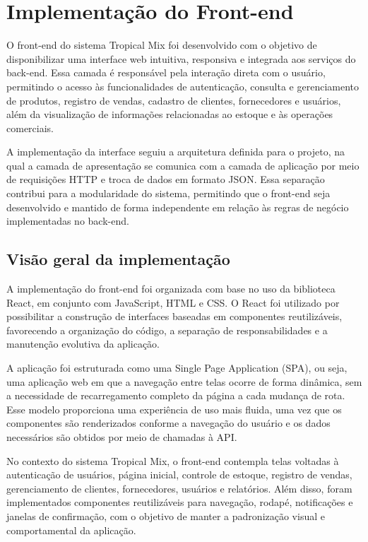 \section{Implementação do Front-end}

O front-end do sistema Tropical Mix foi desenvolvido com o objetivo de disponibilizar uma interface web intuitiva, responsiva e integrada aos serviços do back-end. Essa camada é responsável pela interação direta com o usuário, permitindo o acesso às funcionalidades de autenticação, consulta e gerenciamento de produtos, registro de vendas, cadastro de clientes, fornecedores e usuários, além da visualização de informações relacionadas ao estoque e às operações comerciais.

A implementação da interface seguiu a arquitetura definida para o projeto, na qual a camada de apresentação se comunica com a camada de aplicação por meio de requisições HTTP e troca de dados em formato JSON. Essa separação contribui para a modularidade do sistema, permitindo que o front-end seja desenvolvido e mantido de forma independente em relação às regras de negócio implementadas no back-end.

\subsection{Visão geral da implementação}

A implementação do front-end foi organizada com base no uso da biblioteca React, em conjunto com JavaScript, HTML e CSS. O React foi utilizado por possibilitar a construção de interfaces baseadas em componentes reutilizáveis, favorecendo a organização do código, a separação de responsabilidades e a manutenção evolutiva da aplicação.

A aplicação foi estruturada como uma Single Page Application (SPA), ou seja, uma aplicação web em que a navegação entre telas ocorre de forma dinâmica, sem a necessidade de recarregamento completo da página a cada mudança de rota. Esse modelo proporciona uma experiência de uso mais fluida, uma vez que os componentes são renderizados conforme a navegação do usuário e os dados necessários são obtidos por meio de chamadas à API.

No contexto do sistema Tropical Mix, o front-end contempla telas voltadas à autenticação de usuários, página inicial, controle de estoque, registro de vendas, gerenciamento de clientes, fornecedores, usuários e relatórios. Além disso, foram implementados componentes reutilizáveis para navegação, rodapé, notificações e janelas de confirmação, com o objetivo de manter a padronização visual e comportamental da aplicação.


